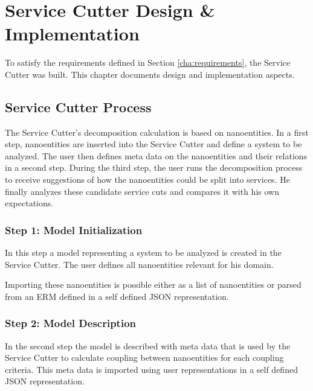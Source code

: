 
\chapter{Service Cutter Design \& Implementation}
\label{cha:implementation}

To satisfy the requirements defined in Section \ref{cha:requirements}, the Service Cutter was built. This chapter documents design and implementation aspects.


\section{Service Cutter Process}

The Service Cutter's decomposition calculation is based on nanoentities. In a first step, nanoentities are inserted into the Service Cutter and define a system to be analyzed. The user then defines meta data on the nanoentities and their relations in a second step. During the third step, the user runs the decomposition process to receive suggestions of how the nanoentities could be split into services. He finally analyzes these candidate service cuts and compares it with his own expectations. 


\subsection{Step 1: Model Initialization}

In this step a model representing a system to be analyzed is created in the Service Cutter. The user defines all nanoentities relevant for his domain. 

Importing these nanoentities is possible either as a list of nanoentities or parsed from an \gls{ERM} defined in a self defined JSON representation.


\subsection{Step 2: Model Description}

In the second step the model is described with meta data that is used by the Service Cutter to calculate coupling between nanoentities for each coupling criteria. This meta data is imported using user representations in a self defined JSON representation.


